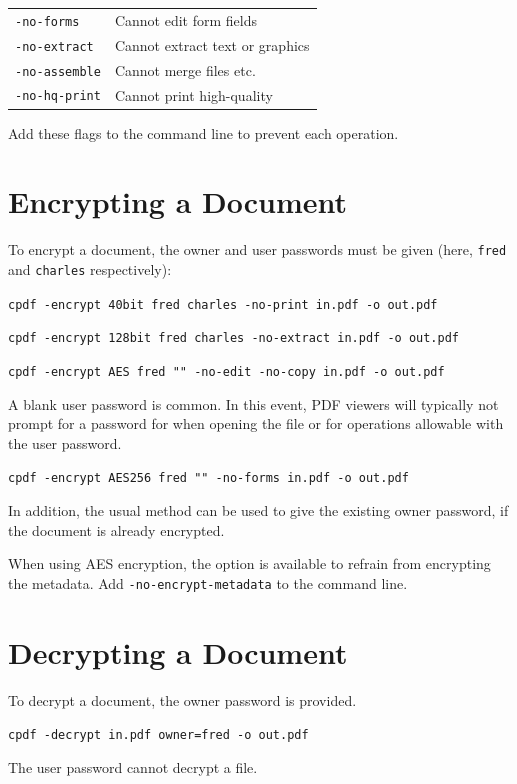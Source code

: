 \documentclass[a4paper,makeidx]{memoir}
\begin{document}
   \vspace{2mm}
   \begin{tabular}{ll}
     \texttt{-no-forms} & Cannot edit form fields\\
     \texttt{-no-extract} & Cannot extract text or graphics\\
     \texttt{-no-assemble} & Cannot merge files etc.\\
     \texttt{-no-hq-print} & Cannot print high-quality\\
   \end{tabular}

  \vspace{2mm}
  \noindent Add these flags to the command line to prevent each operation.

  \vspace{2mm}

  \section{Encrypting a Document}
  To encrypt a document, the owner and user passwords must be given (here, \texttt{fred} and \texttt{charles} respectively):
  \begin{framed}
    \small\verb!cpdf -encrypt 40bit fred charles -no-print in.pdf -o out.pdf!

    \vspace{1.5mm}
    \small\verb!cpdf -encrypt 128bit fred charles -no-extract in.pdf -o out.pdf!

    \vspace{1.5mm}
    \small\verb!cpdf -encrypt AES fred "" -no-edit -no-copy in.pdf -o out.pdf!
  \end{framed}
  \noindent A blank user password is
common. In this event, PDF viewers will typically not prompt for a
password for when opening the file or for operations allowable with the user password.
  \begin{framed}
    \vspace{1.5mm}
    \small\verb!cpdf -encrypt AES256 fred "" -no-forms in.pdf -o out.pdf!
  \end{framed}
\noindent In addition, the usual method can be used to give the existing owner
password, if the document is already encrypted. 

When using AES encryption, the option is available to refrain from encrypting the
metadata. Add \texttt{-no-encrypt-metadata} to the command line.

  \section{Decrypting a Document}
  To decrypt a document, the owner password is provided.
  \begin{framed}
    \small\verb!cpdf -decrypt in.pdf owner=fred -o out.pdf!
  \end{framed}
  \noindent The user password cannot decrypt a file.
\end{document}
